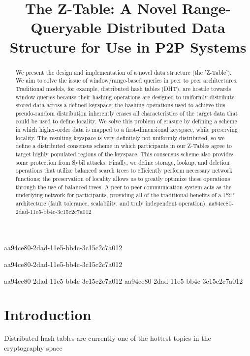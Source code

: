 \documentclass[12pt]{article}
\title{The Z-Table: A Novel Range-Queryable Distributed Data Structure for Use in P2P Systems}
\begin{document}
aa94ce80-2dad-11e5-bb4c-3c15c2c7a012\maketitle

aa94ce80-2dad-11e5-bb4c-3c15c2c7a012\begin{abstract}
We present the design and implementation of a novel data structure (the 'Z-Table'). We aim to solve the issue of window/range-based queries in peer to peer architectures. Traditional models, for example,  distributed hash tables (DHT), are hostile towards window queries because their hashing operations are designed to uniformly distribute stored data across a defined keyspace; the hashing operations used to achieve this pseudo-random distribution inherently erases all characteristics of the target data that could be used to define locality. We solve this problem of erasure by defining a scheme in which higher-order data is mapped to a first-dimensional keyspace, while preserving locality. The resulting keyspace is very definitely not uniformly distributed, so we define a distributed consensus scheme in which participants in our Z-Tables agree to target highly populated regions of the keyspace. This consensus scheme also provides some protection from Sybil attacks. Finally, we define storage, lookup, and deletion operations that utilize balanced search trees to efficiently perform necessary network functions; the preservation of locality allows us to greatly optimize these operations through the use of balanced trees. A peer to peer communication system acts as the underlying network for participants, providing all of the traditional benefits of a P2P architecture (fault tolerance, scalability, and truly independent operation).
aa94ce80-2dad-11e5-bb4c-3c15c2c7a012\end{abstract}

aa94ce80-2dad-11e5-bb4c-3c15c2c7a012
aa94ce80-2dad-11e5-bb4c-3c15c2c7a012\newpage
\section{Introduction}
Distributed hash tables are currently one of the hottest topics in the cryptography space~\cite{Stoica:2001dj,Rowstron:2001ea,Ratnasamy:2001wn}

\printbibliography
\end{document}
